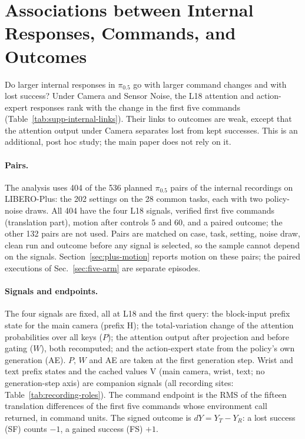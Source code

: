 \section{Associations between Internal Responses, Commands, and Outcomes}
\label{sec:supp-bounded-internal}
Do larger internal responses in $\pi_{0.5}$ go with larger command changes and with lost success? Under Camera and Sensor Noise, the L18 attention and action-expert responses rank with the change in the first five commands (Table~\ref{tab:supp-internal-links}). Their links to outcomes are weak, except that the attention output under Camera separates lost from kept successes. This is an additional, post hoc study; the main paper does not rely on it.

\paragraph{Pairs.}
The analysis uses 404 of the 536 planned $\pi_{0.5}$ pairs of the internal recordings on LIBERO-Plus: the 202 settings on the 28 common tasks, each with two policy-noise draws. All 404 have the four L18 signals, verified first five commands (translation part), motion after controls 5 and 60, and a paired outcome; the other 132 pairs are not used. Pairs are matched on case, task, setting, noise draw, clean run and outcome before any signal is selected, so the sample cannot depend on the signals. Section~\ref{sec:plus-motion} reports motion on these pairs; the paired executions of Sec.~\ref{sec:five-arm} are separate episodes.

\paragraph{Signals and endpoints.}
The four signals are fixed, all at L18 and the first query: the block-input prefix state for the main camera (prefix H); the total-variation change of the attention probabilities over all keys ($P$); the attention output after projection and before gating ($W$), both recomputed; and the action-expert state from the policy's own generation (AE). $P$, $W$ and AE are taken at the first generation step. Wrist and text prefix states and the cached values V (main camera, wrist, text; no generation-step axis) are companion signals (all recording sites: Table~\ref{tab:recording-roles}). The command endpoint is the RMS of the fifteen translation differences of the first five commands whose environment call returned, in command units. The signed outcome is $dY=Y_T-Y_R$: a lost success (SF) counts $-1$, a gained success (FS) $+1$.

